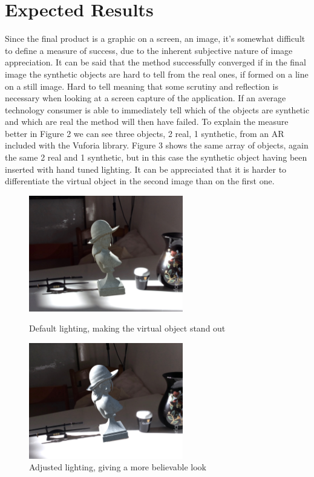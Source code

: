 \section{Expected Results}
Since the final product is a graphic on a screen, an image, it's somewhat difficult to define a measure of success, due to the inherent subjective nature of image appreciation. It can be said that the method successfully converged if in the final image the synthetic objects are hard to tell from the real ones, if formed on a line on a still image. Hard to tell meaning that some scrutiny and reflection is necessary when looking at a screen capture of the application. If an average technology consumer is able to immediately tell which of the objects are synthetic and which are real the method will then have failed. To explain the measure better in Figure 2 we can see three objects, 2 real, 1 synthetic, from an AR included with the Vuforia library. Figure 3 shows the same array of objects, again the same 2 real and 1 synthetic, but in this case the synthetic object having been inserted with hand tuned lighting. It can be appreciated that it is harder to differentiate the virtual object in the second image than on the first one.
\begin{figure}[H]
\centering
\includegraphics[width=0.6\textwidth]{Figures/fake.jpg}
\caption{Default lighting, making the virtual object stand out}
\includegraphics[width=0.6\textwidth]{Figures/realish.jpg}
\caption{Adjusted lighting, giving a more believable look}
\end{figure}
